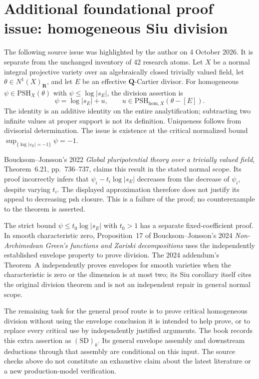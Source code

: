 \documentclass[11pt,a4paper]{article}
\theoremstyle{definition}
\theoremstyle{remark}
\newcommand{\PSH}{\mathrm{PSH}}
\begin{document}
\section*{Additional foundational proof issue: homogeneous Siu division}
The following source issue was highlighted by the author on 4 October
2026. It is separate from the unchanged inventory of 42 research atoms.
Let $X$ be a normal integral projective variety over an algebraically closed
trivially valued field, let $\theta\in N^1(X)_{\mathbf R}$, and let $E$ be
an effective $\mathbf Q$-Cartier divisor. For homogeneous
$\psi\in\PSH_X(\theta)$ with $\psi\leq\log|s_E|$, the division assertion is
\[
 \psi=\log|s_E|+u,
 \qquad u\in\PSH_{\mathrm{hom},X}(\theta-[E]).
\]
The identity is an additive identity on the entire analytification;
subtracting two infinite values at proper support is not its definition.
Uniqueness follows from divisorial determination. The issue is existence
at the critical normalized bound $\sup_{\{\log|s_E|=-1\}}\psi=-1$.

Boucksom--Jonsson's 2022 \emph{Global pluripotential theory over a trivially
valued field}, Theorem~6.21, pp.~736--737, claims this result in the stated
normal scope. Its proof incorrectly infers that
$\psi_i-t_i\log|s_E|$ decreases from the decrease of $\psi_i$, despite
varying $t_i$. The displayed approximation therefore does not justify
its appeal to decreasing psh closure. This is a failure of the proof;
no counterexample to the theorem is asserted.

The strict bound $\psi\leq t_0\log|s_E|$ with $t_0>1$ has a separate
fixed-coefficient proof. In smooth characteristic zero, Proposition~17
of Boucksom--Jonsson's 2024 \emph{Non-Archimedean Green's functions and
Zariski decompositions} uses the independently established envelope property
to prove division. The 2024 addendum's Theorem~A independently proves
envelopes for smooth varieties when the characteristic is zero or the
dimension is at most two; its Siu corollary itself cites the original
division theorem and is not an independent repair in general normal scope.

The remaining task for the general proof route is to prove critical
homogeneous division without using the envelope conclusion it is intended
to help prove, or to replace every critical use by independently justified
arguments. The book records this extra assertion as $\mathrm{(SD)}_k$.
Its general envelope assembly and downstream deductions through that
assembly are conditional on this input. The source checks above do not
constitute an exhaustive claim about the latest literature or a new
production-model verification.
\end{document}
